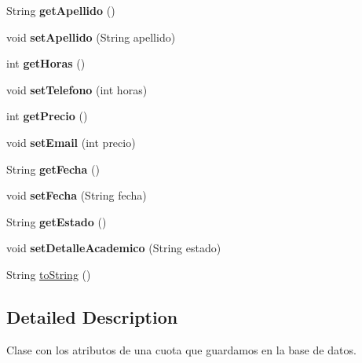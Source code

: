 \begin{DoxyCompactItemize}
String {\bfseries get\+Apellido} ()
\item 
\mbox{\label{class_cuotas_1_1_cuota_a65de1ccc97cd895d9956069cdb23a046}} 
void {\bfseries set\+Apellido} (String apellido)
\item 
\mbox{\label{class_cuotas_1_1_cuota_a78ea167739142c27f73033cabf442711}} 
int {\bfseries get\+Horas} ()
\item 
\mbox{\label{class_cuotas_1_1_cuota_a761780b53ebd9d1a19bac9c485083681}} 
void {\bfseries set\+Telefono} (int horas)
\item 
\mbox{\label{class_cuotas_1_1_cuota_ad3692b88b404b560ee1a181750e7fdd2}} 
int {\bfseries get\+Precio} ()
\item 
\mbox{\label{class_cuotas_1_1_cuota_ae92ba5e33da6e868ca1711983f8154bf}} 
void {\bfseries set\+Email} (int precio)
\item 
\mbox{\label{class_cuotas_1_1_cuota_a3065220670b0711579aa7882ef492df3}} 
String {\bfseries get\+Fecha} ()
\item 
\mbox{\label{class_cuotas_1_1_cuota_a73fefde9e3d41a90de6a8859d521226d}} 
void {\bfseries set\+Fecha} (String fecha)
\item 
\mbox{\label{class_cuotas_1_1_cuota_af5999a4a35abf9fda16b86c916b15615}} 
String {\bfseries get\+Estado} ()
\item 
\mbox{\label{class_cuotas_1_1_cuota_ae2b01a1e54e7d1422fc5f87fd592de87}} 
void {\bfseries set\+Detalle\+Academico} (String estado)
\item 
String \hyperlink{class_cuotas_1_1_cuota_aab4caea7cc4183a96763c7a2c5b298f2}{to\+String} ()
\end{DoxyCompactItemize}


\subsection{Detailed Description}
Clase con los atributos de una cuota que guardamos en la base de datos. 

